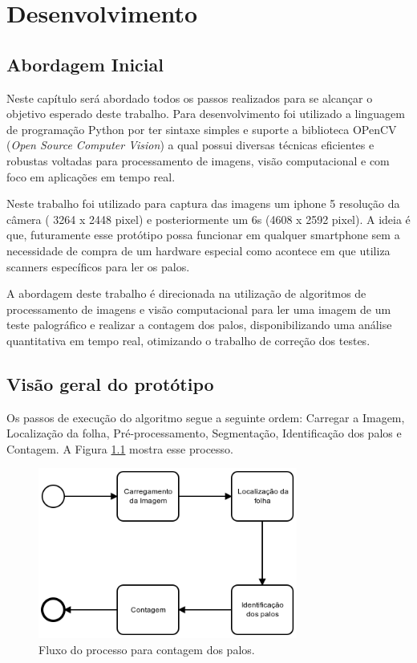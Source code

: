  \chapter{Desenvolvimento}
\label{cap:desenv}

\section{Abordagem Inicial}
\label{sec:abord-ini} 
Neste capítulo será abordado todos os passos realizados para se alcançar o objetivo esperado deste trabalho. Para desenvolvimento foi utilizado a linguagem de programação Python por  ter sintaxe simples e suporte a biblioteca OPenCV (\textit{Open Source Computer Vision}) a qual possui diversas técnicas eficientes  e robustas voltadas para processamento de imagens, visão computacional e com  foco em aplicações em tempo real.

Neste trabalho foi utilizado para captura das imagens um iphone 5 resolução da câmera ( 3264 x 2448 pixel) e posteriormente um 6s (4608 x 2592 pixel). A ideia é que, futuramente esse protótipo possa funcionar em qualquer smartphone sem a necessidade de compra de um hardware especial como acontece em \cite{skip2018} que utiliza scanners específicos para ler os palos.

A abordagem deste trabalho é direcionada na utilização de algoritmos de processamento de imagens e visão computacional para ler uma imagem de um teste palográfico e realizar a contagem dos palos, disponibilizando uma análise quantitativa em tempo real, otimizando o trabalho de correção dos testes.

\section{Visão geral do protótipo}
\label{sec:visao-geral}

Os passos de execução  do algoritmo segue a seguinte ordem:
Carregar a Imagem, Localização da folha, Pré-processamento, Segmentação, Identificação dos palos e Contagem. A Figura \ref{fig:visao-geral} mostra esse processo.

\begin{figure}[H]
 \centering
 \includegraphics[width=0.76\textwidth]{./fig/desenvolvimento/visao-geral}
 \caption{Fluxo do processo para contagem dos palos.}
 \label{fig:visao-geral}
\end{figure}

